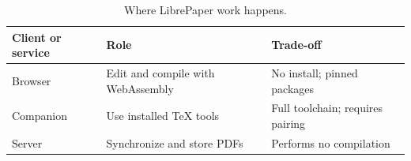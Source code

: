 \begin{table}[ht]
  \centering
  \caption{Where LibrePaper work happens.}
  \begin{tabular}{lll}
    \toprule
    Client or service & Role & Trade-off \\
    \midrule
    Browser & Edit and compile with WebAssembly & No install; pinned packages \\
    Companion & Use installed TeX tools & Full toolchain; requires pairing \\
    Server & Synchronize and store PDFs & Performs no compilation \\
    \bottomrule
  \end{tabular}
\end{table}
